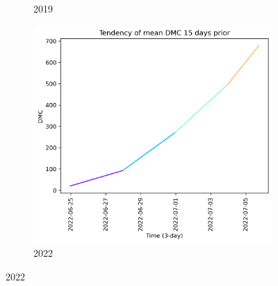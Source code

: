 \begin{figure}[h]
\begin{subfigure}{0.3\textwidth}
        \caption{2019}
        \label{fig:dmc_prior_15_days_2019}
    \end{subfigure}
    \hfill
    \begin{subfigure}{0.3\textwidth}
        \centering
        \includegraphics[width=\textwidth]{graphs/15days/2022_15daysprior_tendency_graph_DMC.png}
        \caption{2022}
        \label{fig:dmc_prior_15_days_2022}
    \end{subfigure}
    
    \label{fig:dmc_values_15days_prior}
\end{figure}

